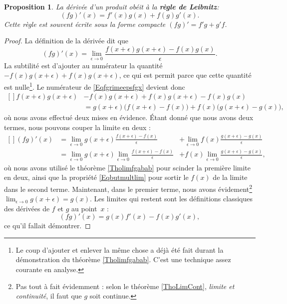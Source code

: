 \documentclass[a4paper,12pt]{book}
\newcounter{numtho}
\theoremstyle{mes_exemples}	\newtheorem{exemple}[numtho]{Exemple}
\theoremstyle{mes_tho}
\newtheorem{proposition}[numtho]{Proposition}
\newcommand{\defe}[2]{\textbf{#1}\index{#2}}
\begin{document}
\begin{proposition}
	La dérivée d'un produit obéit à la \defe{règle de Leibnitz}{Règle de Leibnitz}:
	\begin{equation}
		(fg)'(x)=f'(x)g(x)+f(g)g'(x).
	\end{equation}
	Cette règle est souvent écrite sous la forme compacte $(fg)'=f'g+g'f$.
\end{proposition}

\begin{proof}
La définition de la dérivée dit que
\begin{equation}		\label{Eqfgrimeepsfgx}
	(fg)'(x)=\lim_{\epsilon\to 0}\frac{f(x+\epsilon)g(x+\epsilon)-f(x)g(x)}{\epsilon}.
\end{equation}
La subtilité est d'ajouter au numérateur la quantité $-f(x)g(x+\epsilon)+f(x)g(x+\epsilon)$, ce qui est permit parce que cette quantité est nulle\footnote{Le coup d'ajouter et enlever la même chose a déjà été fait durant la démonstration du théorème \ref{Tholimfgabab}. C'est une technique assez courante en analyse.}. Le numérateur de \eqref{Eqfgrimeepsfgx} devient donc
\begin{equation}
	\begin{aligned}[]
f(x+\epsilon)g(x+\epsilon)&-f(x)g(x+\epsilon)+f(x)g(x+\epsilon)-f(x)g(x) \\
			&= g(x+\epsilon)\big( f(x+\epsilon)-f(x) \big)+f(x)\big( g(x+\epsilon)-g(x) \big),
	\end{aligned}
\end{equation}
où nous avons effectué deux mises en évidence. Étant donné que nous avons deux termes, nous pouvons couper la limite en deux :
\begin{equation}
	\begin{aligned}[]
		(fg)'(x)	&=\lim_{\epsilon\to 0}g(x+\epsilon)\frac{ f(x+\epsilon)-f(x) }{\epsilon} 			&+\lim_{\epsilon\to 0}f(x)\frac{ g(x+\epsilon)-g(x) }{\epsilon}\\
				&=\lim_{\epsilon\to 0}g(x+\epsilon)\lim_{\epsilon\to 0}\frac{ f(x+\epsilon)-f(x) }{\epsilon}	&+f(x)\lim_{\epsilon\to 0}\frac{ g(x+\epsilon)-g(x) }{\epsilon},
	\end{aligned}
\end{equation}
où nous avons utilisé le théorème \ref{Tholimfgabab} pour scinder la première limite en deux, ainsi que la propriété \eqref{Eqbutmultlim} pour sortir le $f(x)$ de la limite dans le second terme. Maintenant, dans le premier terme, nous avons évidement\footnote{Pas tout à fait évidemment : selon le théorème \ref{ThoLimCont}, \emph{limite et continuité}, il faut que $g$ soit continue.} $\lim_{\epsilon\to 0}g(x+\epsilon)=g(x)$. Les limites qui restent sont les définitions classiques des dérivées de $f$ et $g$ au point~$x$ :
\begin{equation}
	(fg)'(x)=g(x)f'(x)-f(x)g'(x),
\end{equation}
ce qu'il fallait démontrer.
\end{proof}
\end{document}
